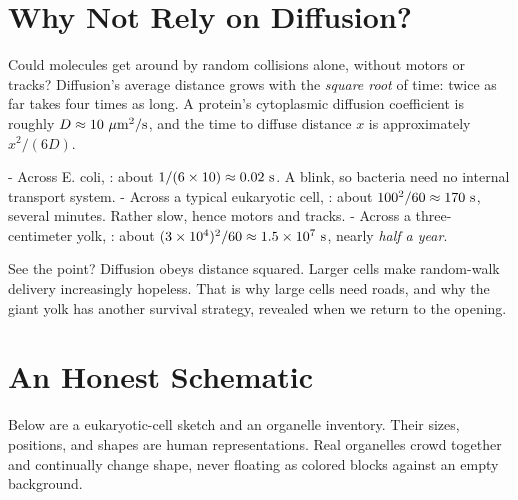 \section{Why Not Rely on Diffusion?}

\begin{qiaoliang}
Could molecules get around by random collisions alone, without motors or tracks? Diffusion's average distance grows with the \emph{square root} of time: twice as far takes four times as long. A protein's cytoplasmic diffusion coefficient is roughly $D\approx10\ \mathrm{\mu m^2/s}$, and the time to diffuse distance $x$ is approximately $x^2/(6D)$.

- Across E. coli, : about $1/(6\times10)\approx0.02\ \mathrm{s}$. A blink, so bacteria need no internal transport system.
- Across a typical eukaryotic cell, : about $100^2/60\approx170\ \mathrm{s}$, several minutes. Rather slow, hence motors and tracks.
- Across a three-centimeter yolk, : about $(3\times10^{4})^2/60\approx1.5\times10^{7}\ \mathrm{s}$, nearly \emph{half a year}.

See the point? Diffusion obeys distance squared. Larger cells make random-walk delivery increasingly hopeless. That is why large cells need roads, and why the giant yolk has another survival strategy, revealed when we return to the opening.
\end{qiaoliang}

\section{An Honest Schematic}

Below are a eukaryotic-cell sketch and an organelle inventory. Their sizes, positions, and shapes are human representations. Real organelles crowd together and continually change shape, never floating as colored blocks against an empty background.

\begin{center}
\end{center}


